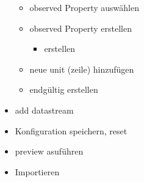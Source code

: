 \begin{itemize}
\begin{itemize}
\item observed Property auswählen
\item observed Property erstellen
\begin{itemize}
\item erstellen
\end{itemize}

\item neue unit (zeile) hinzufügen
\item endgültig erstellen
\end{itemize}

\item add datastream

\item Konfiguration speichern, reset 
\item preview asuführen
\item Importieren
\end{itemize}